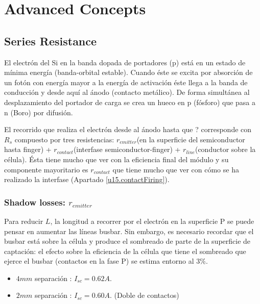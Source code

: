 \section{Advanced Concepts}


\subsection{Series Resistance}
El electrón del Si en la banda dopada de portadores (p) está en un estado de mínima energía (banda-orbital estable). Cuando éste se excita por absorción de un fotón con energía mayor a la energía de activación éste llega a la banda de conducción y desde aquí al ánodo (contacto metálico). De forma simultánea al desplazamiento del portador de carga se crea un hueco en p (fósforo) que pasa a n (Boro) por difusión.

El recorrido que realiza el electrón desde al ánodo hasta que ? corresponde con $ R_s $ compuesto por tres resistencias:  $ r_{emitter} $(en la superficie del semiconductor hasta finger) +  $ r_{contact} $(interfase semiconductor-finger) +  $ r_{line} $(conductor sobre la célula). Ésta tiene mucho que ver con la eficiencia final del módulo y su componente mayoritario es $ r_{contact} $ que tiene mucho que ver con cómo se ha realizado la interfase (Apartado \ref{u15.contactFiring}).


\subsubsection{Shadow losses: $ r_{emitter} $}
Para reducir $ L $, la longitud a recorrer por el electrón en la superficie P se puede pensar en aumentar las líneas busbar. Sin embargo, es necesario recordar que el busbar está sobre la célula y produce el sombreado de parte de la superficie de captación: el efecto sobre la eficiencia de la célula que tiene el sombreado que ejerce el busbar (contactos en la fase P) se estima entorno al 3\%. 
\begin{itemize}
	\item $ 4 mm $ separación : $ I_{sc} = 0.62 A$.
	\item $ 2 mm $ separación : $ I_{sc} = 0.60 A$.	(Doble de contactos)	
\end{itemize}

